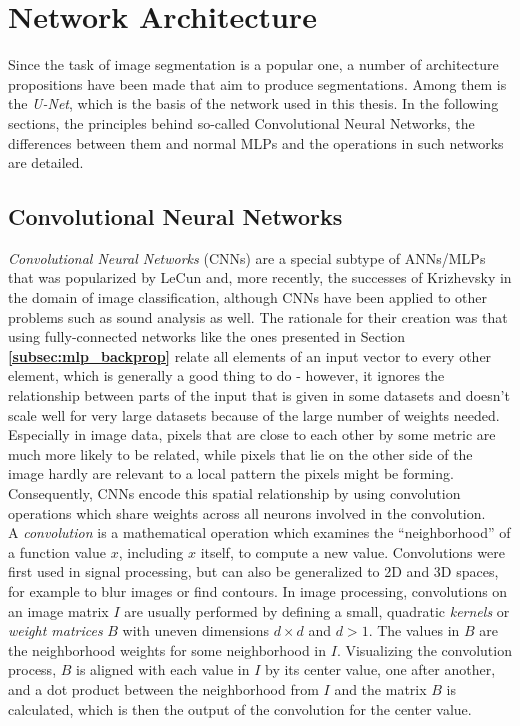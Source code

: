 \chapter {Network Architecture}
\label{chap:network}

Since the task of image segmentation is a popular one, a number of architecture propositions have been made that aim to produce segmentations. Among them is the \textit{U-Net}, which is the basis of the network used in this thesis.  In the following sections, the principles behind so-called Convolutional Neural Networks, the differences between them and normal MLPs and the operations in such networks are detailed.


	\section{Convolutional Neural Networks}
\label{sec:CNN}
\textit{Convolutional Neural Networks} (CNNs) are a special subtype of ANNs/MLPs that was popularized by LeCun \cite{lecun98} and, more recently, the successes of Krizhevsky \cite{krizhevsky2012} in the domain of image classification, although CNNs have been applied to other problems such as sound analysis as well. The rationale for their creation was that using fully-connected networks like the ones presented in Section \textbf{\ref{subsec:mlp_backprop}} relate all elements of an input vector to every other element, which is generally a good thing to do - however, it ignores the relationship between parts of the input that is given in some datasets and doesn't scale well for very large datasets because of the large number of weights needed. Especially in image data, pixels that are close to each other by some metric are much more likely to be related, while pixels that lie on the other side of the image hardly are relevant to a local pattern the pixels might be forming. Consequently, CNNs encode this spatial relationship by using convolution operations which share weights across all neurons involved in the convolution.\\

\noindent A \textit{convolution} is a mathematical operation which examines the ``neighborhood'' of a function value $x$, including $x$ itself, to compute a new value.  Convolutions were first used in signal processing, but can also be generalized to 2D and 3D spaces, for example to blur images or find contours. In image processing, convolutions on an image matrix $I$ are usually performed by defining a small, quadratic \textit{kernels} or \textit{weight matrices} $B$ with uneven dimensions $d \times d$ and $d > 1$. The values in $B$ are the neighborhood weights for some neighborhood in $I$. Visualizing the convolution process, $B$ is aligned with each value in $I$ by its center value, one after another, and a dot product between the neighborhood from $I$ and the matrix $B$ is calculated, which is then the output of the convolution for the center value.

